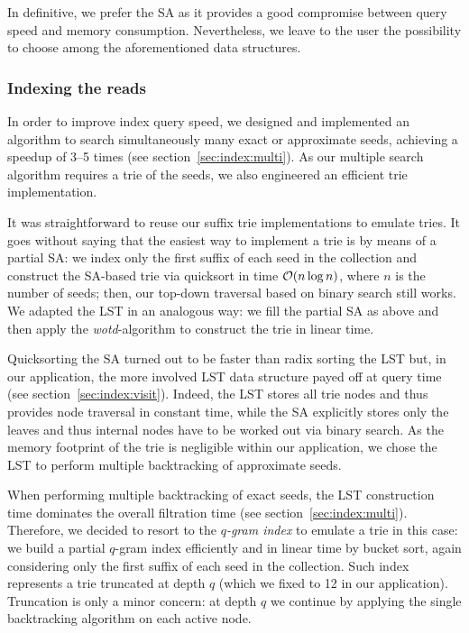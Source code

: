 In definitive, we prefer the SA as it provides a good compromise between query speed and memory consumption.
Nevertheless, we leave to the user the possibility to choose among the aforementioned data structures.

\subsubsection{Indexing the reads}

In order to improve index query speed, we designed and implemented an algorithm to search simultaneously many exact or approximate seeds, achieving a speedup of 3--5 times (see section~\ref{sec:index:multi}).
As our multiple search algorithm requires a trie of the seeds, we also engineered an efficient trie implementation.

It was straightforward to reuse our suffix trie implementations to emulate tries.
It goes without saying that the easiest way to implement a trie is by means of a partial SA:
we index only the first suffix of each seed in the collection and construct the SA-based trie via quicksort in time $\mathcal{O}(n \log n)$, where $n$ is the number of seeds; then, our top-down traversal based on binary search still works.
We adapted the LST in an analogous way: we fill the partial SA as above and then apply the \emph{wotd}-algorithm \citep{Giegerich1999} to construct the trie in linear time.

Quicksorting the SA turned out to be faster than radix sorting the LST but, in our application, the more involved LST data structure payed off at query time (see section~\ref{sec:index:visit}).
Indeed, the LST stores all trie nodes and thus provides node traversal in constant time, while the SA explicitly stores only the leaves and thus internal nodes have to be worked out via binary search.
As the memory footprint of the trie is negligible within our application, we chose the LST to perform multiple backtracking of approximate seeds.

When performing multiple backtracking of exact seeds, the LST construction time dominates the overall filtration time (see section~\ref{sec:index:multi}).
Therefore, we decided to resort to the \emph{$q$-gram index} to emulate a trie in this case:
we build a partial $q$-gram index efficiently and in linear time by bucket sort, again considering only the first suffix of each seed in the collection.
Such index represents a trie truncated at depth $q$ (which we fixed to 12 in our application).
Truncation is only a minor concern: at depth $q$ we continue by applying the single backtracking algorithm on each active node.

